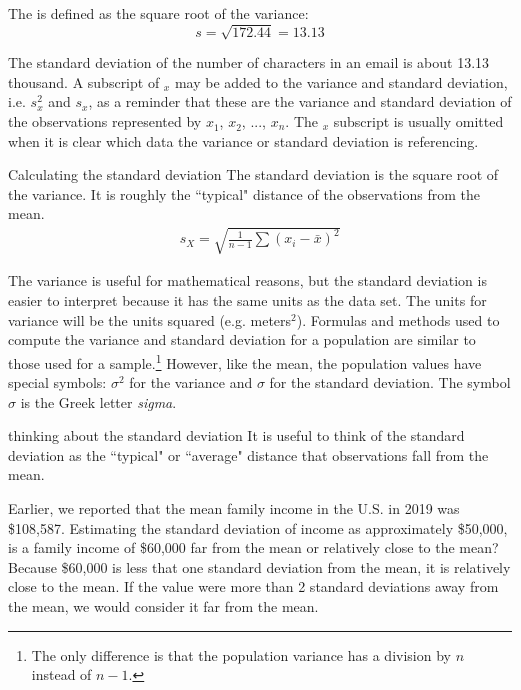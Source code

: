 The  is defined as the square root of the variance:
$$s=\sqrt{172.44} = 13.13$$

The standard deviation of the number of characters in an email is about 13.13 thousand. A subscript of $_x$ may be added to the variance and standard deviation, i.e. $s_x^2$ and $s_x^{}$, as a reminder that these are the variance and standard deviation of the observations represented by $x_1^{}$, $x_2^{}$, ..., $x_n^{}$. The $_{x}$ subscript is usually omitted when it is clear which data the variance or standard deviation is referencing.


\D{\newpage}

\begin{onebox}{Calculating the standard deviation}
The standard deviation is the square root of the variance. It is roughly the ``typical" distance of the observations from the mean.
\begin{eqnarray*}
\label{sdEquation}
s_{\scriptscriptstyle{X}}
 = \sqrt{\frac{1}{n-1} \sum{(x_i -  \bar{x})^2}}
\end{eqnarray*}
\end{onebox}

The variance is useful for mathematical reasons, but the standard deviation is easier to interpret because it has the same units as the data set. The units for variance will be the units squared (e.g. meters$^2$).
Formulas and methods used to compute the variance and standard deviation for a population are similar to those used for a sample.\footnote{The only difference is that the population variance has a division by $n$ instead of $n-1$.} However, like the mean, the population values have special symbols: $\sigma_{}^2$ for the variance and $\sigma$ for the standard deviation. The symbol $\sigma$  is the Greek letter \emph{sigma}.

\begin{onebox}{thinking about the standard deviation}
It is useful to think of the standard deviation as the ``typical" or ``average" distance that observations fall from the mean.\end{onebox}



\begin{examplewrap}
\begin{nexample}{Earlier, we reported that the mean family income in the U.S. in 2019 was \$108,587.  Estimating the standard deviation of income as approximately \$50,000, is a family income of \$60,000 far from the mean or relatively close to the mean?}
Because \$60,000 is less that one standard deviation from the mean, it is relatively close to the mean. If the value were more than 2 standard deviations away from the mean, we would consider it far from the mean.
\end{nexample}
\end{examplewrap}


